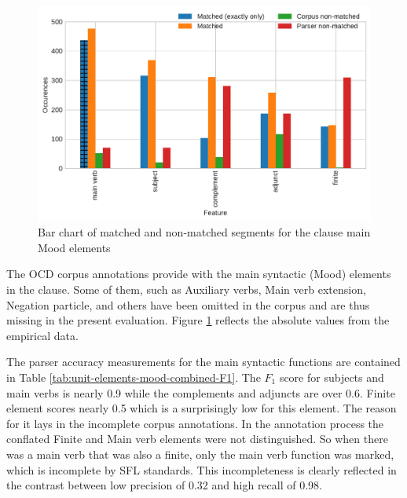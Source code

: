     \begin{figure}[!ht]
    \centering
    \includegraphics[width=.85\textwidth]{evaluation-results/figures/unit-elements-mood-data.pdf}
    \caption{Bar chart of matched and non-matched segments for the clause main Mood elements}
    \label{fig:unit-elements-mood-data}
    \end{figure}
    
    The OCD corpus annotations provide with the main syntactic (Mood) elements in the clause. Some of them, such as Auxiliary verbs, Main verb extension, Negation particle, and others have been omitted in the corpus and are thus missing in the present evaluation. Figure  \ref{fig:unit-elements-mood-data} reflects the absolute values from the empirical data. 
    
    The parser accuracy measurements for the main syntactic functions are contained in Table \ref{tab:unit-elements-mood-combined-F1}. The $F_1$ score for subjects and main verbs is nearly 0.9 while the complements and adjuncts are over 0.6. Finite element scores nearly 0.5 which is a surprisingly low for this element. The reason for it lays in the incomplete corpus annotations. In the annotation process the conflated Finite and Main verb elements were not distinguished. So when there was a main verb that was also a finite, only the main verb function was marked, which is incomplete by SFL standards. This incompleteness is clearly reflected in the contrast between low precision of 0.32 and high recall of 0.98. 
    
